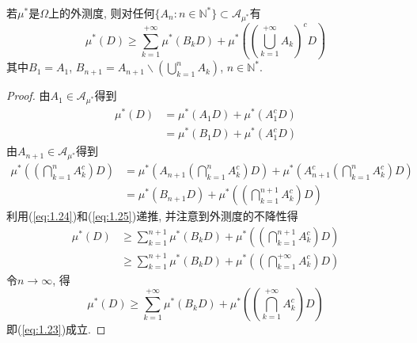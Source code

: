 \begin{lemma}\label{lamma:1.23}
	若$\mu^*$是$\Omega$上的外测度, 则对任何$\{A_n:n\in\mathbb{N}^* \}\subset\mathscr{A}_{\mu^*}$有
	\begin{equation}
		\mu^*(D)\geqslant \sum_{k=1}^{+\infty}\mu^*(B_kD)+\mu^*\left( 
		\left( \bigcup_{k=1}^{+\infty}A_k \right)^c D	
		\right)\label{eq:1.23}
	\end{equation}
	其中$B_1 = A_1$, $B_{n+1} = A_{n+1}\backslash \left( \bigcup_{k=1}^n A_k \right)$, $n\in\mathbb{N}^*$.
\end{lemma}
\begin{proof}
	由$A_1\in\mathscr{A}_{\mu^*}$得到
	\begin{align}
		\mu^*(D) &= \mu^*(A_1D) + \mu^*(A_1^cD)\nonumber\\
		&= \mu^*(B_1D) + \mu^*(A_1^cD)\label{eq:1.24}
	\end{align}
	由$A_{n+1}\in\mathscr{A}_{\mu^*}$得到
	\begin{align}\label{eq:1.25}
		\mu^*\left( \left( \bigcap_{k=1}^{n}A_k^c \right) D	\right)&= \mu^*\left(A_{n+1} \left( \bigcap_{k=1}^{n}A_k^c \right) D	\right)+\mu^*\left( A_{n+1}^c\left( \bigcap_{k=1}^{n}A_k^c \right) D	\right)\nonumber\\
		&= \mu^*(B_{n+1}D) + \mu^*\left( \left( \bigcap_{k=1}^{n+1}A_k^c \right) D	\right)
	\end{align}
	利用(\ref{eq:1.24})和(\ref{eq:1.25})递推, 并注意到外测度的不降性得
	\begin{align}
		\mu^*(D) &\geqslant \sum_{k=1}^{n+1}\mu^*(B_kD) + \mu^*\left( \left( \bigcap_{k=1}^{n+1}A_k^c \right) D	\right)\nonumber\\
		&\geqslant\sum_{k=1}^{n+1}\mu^*(B_kD) + \mu^*\left( \left( \bigcap_{k=1}^{+\infty}A_k^c \right) D	\right)
	\end{align}
	令$n\to\infty$, 得
	\begin{equation}
		\mu^*(D) \geqslant \sum_{k=1}^{+\infty}\mu^*(B_kD) + \mu^*\left( \left( \bigcap_{k=1}^{+\infty}A_k^c \right) D	\right)
	\end{equation}
	即(\ref{eq:1.23})成立.
\end{proof}

